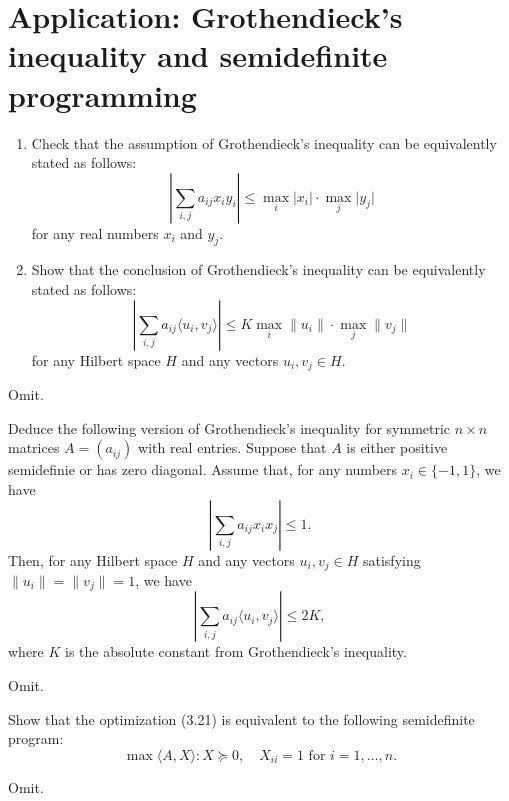 \section{Application: Grothendieck's inequality and semidefinite programming}
\begin{problem*}[Exercise 3.5.2]\label{ex3.5.2}
	\begin{enumerate}
		\item\label{ex3.5.2:a} Check that the assumption of Grothendieck's inequality can be equivalently stated as follows:
		      \[
			      \left\lvert \sum_{i, j} a_{ij} x_i y_i \right\rvert
			      \leq \max _i \lvert x_i \rvert \cdot \max _j \lvert y_j \rvert
		      \]
		      for any real numbers \(x_i\) and \(y_j\).
		\item\label{ex3.5.2:b} Show that the conclusion of Grothendieck's inequality can be equivalently stated as follows:
		      \[
			      \left\lvert \sum_{i, j} a_{ij} \langle u_i, v_j \rangle \right\rvert
			      \leq K \max _i \lVert u_i \rVert \cdot \max _j \lVert v_j \rVert
		      \]
		      for any Hilbert space \(H\) and any vectors \(u_i, v_j \in H\).
	\end{enumerate}
\end{problem*}
\begin{answer}
	Omit.
\end{answer}

\begin{problem*}[Exercise 3.5.3]\label{ex3.5.3}
	Deduce the following version of Grothendieck's inequality for symmetric \(n \times n\) matrices \(A = (a_{ij})\) with real entries. Suppose that \(A\) is either positive semidefinie or has zero diagonal. Assume that, for any numbers \(x_i \in \{ -1, 1 \} \), we have
	\[
		\left\lvert \sum_{i, j} a_{ij} x_i x_j \right\rvert
		\leq 1.
	\]
	Then, for any Hilbert space \(H\) and any vectors \(u_i, v_j \in H\) satisfying \(\lVert u_i \rVert = \lVert v_j \rVert = 1\), we have
	\[
		\left\lvert \sum_{i, j} a_{ij} \langle u_i, v_j \rangle  \right\rvert
		\leq 2K,
	\]
	where \(K\) is the absolute constant from Grothendieck's inequality.
\end{problem*}
\begin{answer}
	Omit.
\end{answer}

\begin{problem*}[Exercise 3.5.5]\label{ex3.5.5}
	Show that the optimization (3.21) is equivalent to the following semidefinite program:
	\[
		\max \langle A, X \rangle \colon X \succeq 0, \quad X_{ii} = 1 \text{ for } i = 1, \dots , n.
	\]
\end{problem*}
\begin{answer}
	Omit.
\end{answer}

